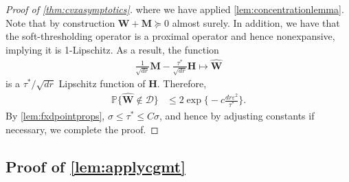 \documentclass[10pt]{article}
\newcommand{\eps}{\ensuremath{\varepsilon}}
\newcommand{\s}{^*}
\newcommand{\p}{\mathbb{P}}
\renewcommand{\hat}{\widehat}
\theoremstyle{definition}
\begin{document}
\begin{proof}[Proof of \cref{thm:cvxasymptotics}]
where we have applied \cref{lem:concentrationlemma}.   
Note that by construction $\bm{W} + \bm{M} \succcurlyeq 0$ almost surely.  In addition, we have that the soft-thresholding operator is a proximal operator and hence nonexpansive, implying it is 1-Lipschitz.  As a result, the function 
\begin{align}
    \frac{1}{\sqrt{dr}}  \bm{M} - \frac{\tau\s}{\sqrt{dr}} \bm{H} \mapsto \bm{\hat W}
\end{align}
is a $\tau\s/\sqrt{dr}$ Lipschitz function of $\bm{H}$.  Therefore,
\begin{align}
    \p\big\{ \bm{\hat W} \notin \mathcal{D} \big\} &\leq 2 \exp \big\{ - c \frac{d r \eps^2}{\tau\s} \big\}.
\end{align}
By \cref{lem:fxdpointprops},  $\sigma \leq \tau\s \leq C \sigma $, and hence by adjusting constants if necessary, we complete the proof.
\end{proof}


\subsection{Proof of \cref{lem:applycgmt}} \label{sec:lem:applycgmt}
\end{document}
